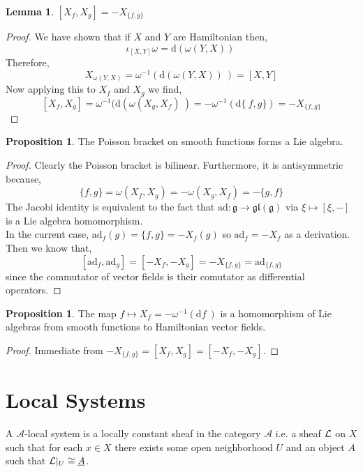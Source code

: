 \documentclass[12pt]{extarticle}
\renewcommand{\d}[1]{ \mathrm{d}#1 \:}
\theoremstyle{definition}
\newtheorem{lemma}[theorem]{Lemma}
\newtheorem{proposition}[theorem]{Proposition}
\newenvironment{definition}[1][Definition:]{\begin{trivlist}
\item[\hskip \labelsep {\bfseries #1}]}{\end{trivlist}}
\begin{document}
\begin{lemma}
$[X_f, X_g] = - X_{\{ f, g \}}$ 
\end{lemma}

\begin{proof}
We have shown that if $X$ and $Y$ are Hamiltonian then,
\[ \iota_{[X,Y]} \omega = \d{(\omega(Y, X))} \]
Therefore,
\[ X_{\omega(Y, X)} = \omega^{-1}(\d{(\omega(Y, X))}) = [X, Y] \]
Now applying this to $X_f$ and $X_g$ we find,
\[ [X_f, X_g] = \omega^{-1}(\d{(\omega(X_g, X_f)}) = - \omega^{-1}(\d \{f, g \}) = - X_{\{ f, g \}} \]
\end{proof}

\begin{proposition}
The Poisson bracket on smooth functions forms a Lie algebra.
\end{proposition}

\newcommand{\ad}{\mathrm{ad}}

\begin{proof}
Clearly the Poisson bracket is bilinear. Furthermore, it is antisymmetric because,
\[ \{ f ,g \} = \omega(X_f, X_g) = - \omega(X_g, X_f) = - \{ g, f \} \]
The Jacobi identity is equivalent to the fact that $\ad : \mathfrak{g} \to \mathfrak{gl}(\mathfrak{g})$ via $\xi \mapsto [\xi, -]$ is a Lie algebra homomorphism. 
\bigskip\\
In the current case, $\ad_f(g) = \{ f, g \} = -X_f(g)$ so $\ad_f = -X_f$ as a derivation. Then we know that,
\[ [ \ad_f, \ad_g] = [-X_f, -X_g] = - X_{\{f, g\}} = \ad_{\{f, g \}} \]
since the commutator of vector fields is their comutator as differential operators. 
\end{proof}

\begin{proposition}
The map $f \mapsto X_f = - \omega^{-1}(\d{f})$ is a homomorphism of Lie algebras from smooth functions to Hamiltonian vector fields.
\end{proposition}

\begin{proof}
Immediate from $-X_{\{f, g\}} = [X_f, X_g] = [- X_f, - X_g]$. 
\end{proof}

\section{Local Systems}

\newcommand{\im}{\mathrm{im} \:}
\newcommand{\A}{\mathcal{A}}
\newcommand{\E}{\mathcal{E}}

\begin{definition}
A $\A$-local system is a locally constant sheaf in the category $\A$ i.e. a sheaf $\mathcal{L}$ on $X$ such that for each $x \in X$ there exists some open neighborhood $U$ and an object $A$ such that $\mathcal{L} |_U \cong \underline{A}$.
\end{definition}
\end{document}
